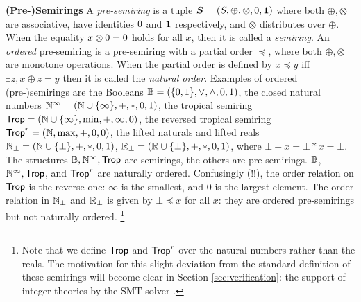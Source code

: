 
{\bf (Pre-)Semirings} A {\em pre-semiring} is a tuple
$\bm S = (S, \oplus, \otimes, \bar 0, \bm 1)$ where  both $\oplus, \otimes$ are associative, have
identities $\bar 0$ and $\bm 1$ respectively, and $\otimes$ distributes
over $\oplus$.    When the equality $x \otimes \bar 0 = \bar 0$ holds
for all $x$, then it is called a {\em semiring}.  An {\em ordered}
pre-semiring is a pre-semiring with a partial order $\preceq$, where
both $\oplus, \otimes$ are monotone operations.  When the partial
order is defined by $x\preceq y$ iff $\exists z, x\oplus z = y$ then
it is called the {\em natural order}.  Examples of ordered
(pre-)semirings are the Booleans
$\mathbb B = (\{0,1\}, \vee, \wedge, 0, 1)$, the closed natural numbers
$\mathbb N^\infty = (\mathbb N \cup \{\infty\},+,*,0,1)$, the tropical semiring
$\text{\sf Trop} = (\mathbb N \cup \{\infty\}, \min, +, \infty,0)$, the reversed
tropical semiring $\text{\sf Trop}^r=(\mathbb N, \max, +, 0, 0)$, the lifted naturals
and lifted reals $\mathbb N_\bot = (\mathbb N \cup \{\bot\}, +, *, 0, 1)$,
$\mathbb R_\bot = (\mathbb R \cup \{\bot\}, +, *, 0, 1)$, where
$\bot + x = \bot * x = \bot$.  The structures $\mathbb B, \mathbb N^\infty, \text{\sf Trop}$
are semirings, the others are pre-semirings.  $\mathbb B$,
$\mathbb N^\infty, \text{\sf Trop}$, and $\text{\sf Trop}^r$ are naturally ordered.  Confusingly
(!!), the order relation on $\text{\sf Trop}$ is the reverse one: $\infty$ is
the smallest, and $0$ is the largest element.  The order relation in
$\mathbb N_\bot$ and $\mathbb R_\bot$ is given by $\bot \preceq x$ for all $x$: they
are ordered pre-semirings but not naturally ordered.%
\footnote{Note that we define $\text{\sf Trop}$ and $\text{\sf Trop}^r$ over the natural
  numbers rather than the reals. The motivation for this slight
  deviation from the standard definition of these semirings will
  become clear in Section \ref{sec:verification}: the support of
  integer theories by the SMT-solver \zzz.}


